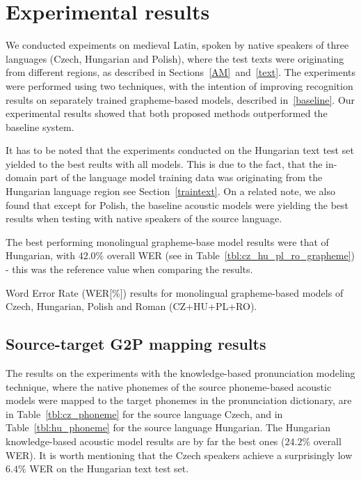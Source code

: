 \documentclass[runningheads,a4paper]{llncs}
\begin{document}
\section{Experimental results}\label{results}
We conducted expeiments on medieval Latin, spoken by native speakers of three languages (Czech, Hungarian and Polish), where the test texts were originating from different regions, as described in Sections~\ref{AM}~and~\ref{text}.
The experiments were performed using two techniques, with the intention of improving recognition results on separately trained grapheme-based models, described in~\ref{baseline}.
Our experimental results showed that both proposed methods outperformed the baseline system.

It has to be noted that the experiments conducted on the Hungarian text test set yielded to the best reults with all models.
This is due to the fact, that the in-domain part of the language model training data was originating from the Hungarian language region see Section~\ref{traintext}.
On a related note, we also found that except for Polish, the baseline acoustic models were yielding the best results when testing with native speakers of the source language.

The best performing monolingual grapheme-base model results were that of Hungarian, with $42.0\%$ overall WER (see in Table~\ref{tbl:cz_hu_pl_ro_grapheme}) - this was the reference value when comparing the results.
\begin{table}
\centering
\caption{Word Error Rate (WER[\%]) results for monolingual grapheme-based models of Czech, Hungarian, Polish and Roman (CZ+HU+PL+RO).}
\label{tbl:cz_hu_pl_ro_grapheme}
\end{table}

\subsection{Source-target G2P mapping results}
The results on the experiments with the knowledge-based pronunciation modeling technique, where the native phonemes of the source phoneme-based acoustic models were mapped to the target phonemes in the pronunciation dictionary, are in Table~\ref{tbl:cz_phoneme} for the source language Czech, and in Table~\ref{tbl:hu_phoneme} for the source language Hungarian.
The Hungarian knowledge-based acoustic model results are by far the best ones ($24.2\%$ overall WER).
It is worth mentioning that the Czech speakers achieve a surprisingly low $6.4\%$ WER on the Hungarian text test set.
\end{document}
